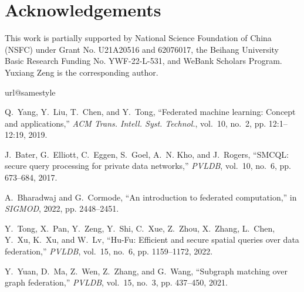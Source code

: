 \documentclass[11pt]{article}
\begin{document}
\section*{Acknowledgements}
This work is partially supported by National Science Foundation of China (NSFC) under Grant No. U21A20516 and 62076017, the Beihang University Basic Research Funding No. YWF-22-L-531, and WeBank Scholars Program. Yuxiang Zeng is the corresponding author. 

%
%

\begin{thebibliography}{10}
\providecommand{\url}[1]{#1}
\csname url@samestyle\endcsname
\providecommand{\newblock}{\relax}
\providecommand{\bibinfo}[2]{#2}
\providecommand{\BIBentrySTDinterwordspacing}{\spaceskip=0pt\relax}
\providecommand{\BIBentryALTinterwordstretchfactor}{4}
\providecommand{\BIBentryALTinterwordspacing}{\spaceskip=\fontdimen2\font plus
\BIBentryALTinterwordstretchfactor\fontdimen3\font minus
  \fontdimen4\font\relax}
\providecommand{\BIBforeignlanguage}[2]{{%
\expandafter\ifx\csname l@#1\endcsname\relax
\typeout{** WARNING: IEEEtran.bst: No hyphenation pattern has been}%
\typeout{** loaded for the language `#1'. Using the pattern for}%
\typeout{** the default language instead.}%
\else
\language=\csname l@#1\endcsname
\fi
#2}}
\providecommand{\BIBdecl}{\relax}
\BIBdecl

Q.~Yang, Y.~Liu, T.~Chen, and Y.~Tong, ``Federated machine learning: Concept
  and applications,'' \emph{{ACM} Trans. Intell. Syst. Technol.}, vol.~10,
  no.~2, pp. 12:1--12:19, 2019.

J.~Bater, G.~Elliott, C.~Eggen, S.~Goel, A.~N. Kho, and J.~Rogers, ``{SMCQL:}
  secure query processing for private data networks,'' \emph{{PVLDB}}, vol.~10,
  no.~6, pp. 673--684, 2017.

A.~Bharadwaj and G.~Cormode, ``An introduction to federated computation,'' in
  \emph{{SIGMOD}}, 2022, pp. 2448--2451.

Y.~Tong, X.~Pan, Y.~Zeng, Y.~Shi, C.~Xue, Z.~Zhou, X.~Zhang, L.~Chen, Y.~Xu,
  K.~Xu, and W.~Lv, ``{Hu-Fu}: Efficient and secure spatial queries over data
  federation,'' \emph{{PVLDB}}, vol.~15, no.~6, pp. 1159--1172, 2022.

Y.~Yuan, D.~Ma, Z.~Wen, Z.~Zhang, and G.~Wang, ``Subgraph matching over graph
  federation,'' \emph{{PVLDB}}, vol.~15, no.~3, pp. 437--450, 2021.


\end{thebibliography}
\end{document}
